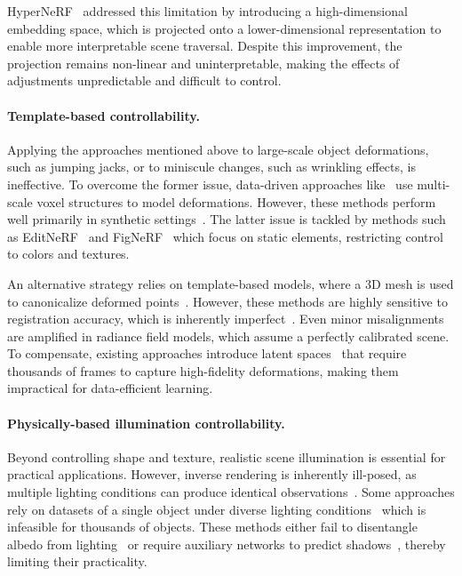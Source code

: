     HyperNeRF~\cite{park2021hypernerf} addressed this limitation by introducing a
    high-dimensional embedding space, which is projected onto a lower-dimensional
    representation to enable more interpretable scene traversal.
    Despite this improvement, the projection remains non-linear and
    uninterpretable, making the effects of adjustments unpredictable and difficult
    to control.

  \paragraph{Template-based controllability.}
    Applying the approaches mentioned above to large-scale object deformations,
    such as jumping jacks, or to miniscule changes, such as wrinkling effects, is
    ineffective.
    To overcome the former issue, data-driven approaches
    like~\textcite{fang2022fast} use multi-scale voxel structures to model
    deformations.
    However, these methods perform well primarily in synthetic
    settings~\cite{pumarola2021d}.
    The latter issue is tackled by methods such as EditNeRF~\cite{liu2021editing}
    and FigNeRF~\cite{xie2021fig} which focus on static elements, restricting
    control to colors and textures.

    An alternative strategy relies on template-based models, where a 3D mesh is
    used to canonicalize deformed points~\cite{zielonka2022instant}.
    However, these methods are highly sensitive to registration accuracy, which is
    inherently imperfect~\cite{feng2021learning, zielonka2022towards}.
    Even minor misalignments are amplified in radiance field models, which assume
    a perfectly calibrated scene.
    To compensate, existing approaches introduce latent
    spaces~\cite{grassal2022neural, kania2022conerf, martin2021nerfw} that require
    thousands of frames to capture high-fidelity deformations, making them
    impractical for data-efficient learning.

  \paragraph{Physically-based illumination controllability.}
    Beyond controlling shape and texture, realistic scene illumination is
    essential for practical applications.
    However, inverse rendering is inherently ill-posed, as multiple lighting
    conditions can produce identical observations~\cite{patow2003survey}.
    Some approaches rely on datasets of a single object under diverse lighting
    conditions~\cite{chen2022hallucinated,yang2023crnerf,rudnev2022nerfosr} which
    is infeasible for thousands of objects.
    These methods either fail to disentangle albedo from
    lighting~\cite{chen2022hallucinated, yang2023crnerf} or require auxiliary
    networks to predict shadows~\cite{rudnev2022nerfosr}, thereby limiting their
    practicality.

